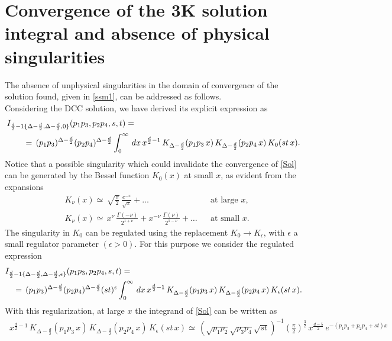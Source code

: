 \documentclass[a4paper,11pt,openright,twoside]{book}
\numberwithin{equation}{section}
\begin{document}
{\section{Convergence of the 3K solution integral and absence of physical singularities}\label{convergence}
The absence of unphysical singularities in the domain of convergence of the solution found, given in \eqref{ssm1}, can be addressed as follows. \\
Considering the DCC solution, we have derived its explicit expression as
\begin{align}
	&I_{\frac{d}{2}-1\{\Delta-\frac{d}{2},\Delta-\frac{d}{2},0\}}(p_1p_3,p_2p_4,s,t)=\notag\\
	&\qquad=\,(p_1p_3)^{\Delta-\frac{d}{2}}(p_2p_4)^{\Delta-\frac{d}{2}}\int_{0}^\infty\,dx\,x^{\frac{d}{2}-1}\,K_{\Delta-\frac{d}{2}}(p_1p_3\,x)\,K_{\Delta-\frac{d}{2}}(p_2p_4\,x)\,K_{0}(st\,x).\label{Sol}
\end{align}
Notice that a possible singularity which could invalidate the convergence of \eqref{Sol} can be generated by the Bessel function $K_0(x)$ at small $x$, as evident from the expansions 
\begin{align}
	\label{questoK}
	&K_{\nu}(x)\simeq\,\sqrt{\frac{\pi}{2}}\,\frac{e^{-x}}{\sqrt{x}}+\dots&&\text{at large $x$},\\
	&K_{\nu}(x)\simeq\,x^\nu\,\frac{\Gamma(-\nu)}{2^{1+\nu}}+x^{-\nu}\,\frac{\Gamma(\nu)}{2^{1-\nu}}+\dots&&\text{at small $x$}.
\end{align}
The singularity in $K_0$ can be regulated using the replacement 
$K_0\to K_\epsilon$, with $\epsilon$ a small regulator parameter $(\epsilon >0)$. For this purpose we consider the regulated expression
\begin{align}
	&I_{\frac{d}{2}-1\{\Delta-\frac{d}{2},\Delta-\frac{d}{2},\epsilon\}}(p_1p_3,p_2p_4,s,t)=\notag\\
	&\quad=\,(p_1p_3)^{\Delta-\frac{d}{2}}(p_2p_4)^{\Delta-\frac{d}{2}}(st)^\epsilon\int_{0}^\infty\,dx\,x^{\frac{d}{2}-1}\,K_{\Delta-\frac{d}{2}}(p_1p_3\,x)\,K_{\Delta-\frac{d}{2}}(p_2p_4\,x)\,K_{\epsilon}(st\,x).\label{sol}
\end{align}
With this regularization, at large $x$ the integrand  of \eqref{Sol} can be written as
\begin{align}
	\,x^{\frac{d}{2}-1}\,K_{\Delta-\frac{d}{2}}(p_1p_3\,x)\,K_{\Delta-\frac{d}{2}}(p_2p_4\,x)\,K_{\epsilon}(st\,x)\simeq\,(\sqrt{p_1p_2}\sqrt{p_3p_4}\sqrt{st})^{-1}\left(\frac{\pi}{2}\right)^{\frac{3}{2}}\,x^{\frac{d-5}{2}}\,e^{-(p_1p_3+p_2p_4+st)x}
\end{align}
}
\end{document}
